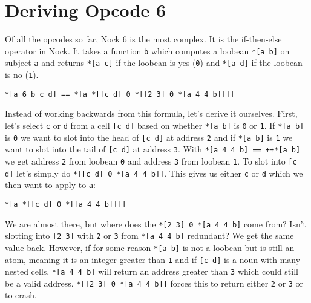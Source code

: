 \documentclass[twoside]{article}
\begin{document}
\section{Deriving Opcode 6}

Of all the opcodes so far, Nock 6 is the most complex. It is the if-then-else operator in Nock. It takes a function \lstinline[style=inlinecode]{b} which computes a loobean \lstinline[style=inlinecode]{*[a b]} on subject \lstinline[style=inlinecode]{a} and returns \lstinline[style=inlinecode]{*[a c]} if the loobean is yes (\lstinline[style=inlinecode]{0}) and \lstinline[style=inlinecode]{*[a d]} if the loobean is no (\lstinline[style=inlinecode]{1}).

\begin{lstlisting}[style=listingblock]
*[a 6 b c d] == *[a *[[c d] 0 *[[2 3] 0 *[a 4 4 b]]]]
\end{lstlisting}

\noindent
Instead of working backwards from this formula, let's derive it ourselves. First, let's select \lstinline[style=inlinecode]{c} or \lstinline[style=inlinecode]{d} from a cell \lstinline[style=inlinecode]{[c d]} based on whether \lstinline[style=inlinecode]{*[a b]} is \lstinline[style=inlinecode]{0} or \lstinline[style=inlinecode]{1}. If \lstinline[style=inlinecode]{*[a b]} is \lstinline[style=inlinecode]{0} we want to slot into the head of \lstinline[style=inlinecode]{[c d]} at address \lstinline[style=inlinecode]{2} and if \lstinline[style=inlinecode]{*[a b]} is \lstinline[style=inlinecode]{1} we want to slot into the tail of \lstinline[style=inlinecode]{[c d]} at address \lstinline[style=inlinecode]{3}. With \lstinline[style=inlinecode]{*[a 4 4 b] == ++*[a b]} we get address \lstinline[style=inlinecode]{2} from loobean \lstinline[style=inlinecode]{0} and address \lstinline[style=inlinecode]{3} from loobean \lstinline[style=inlinecode]{1}. To slot into \lstinline[style=inlinecode]{[c d]} let's simply do \lstinline[style=inlinecode]{*[[c d] 0 *[a 4 4 b]]}. This gives us either \lstinline[style=inlinecode]{c} or \lstinline[style=inlinecode]{d} which we then want to apply to \lstinline[style=inlinecode]{a}:

\begin{lstlisting}[style=listingblock]
*[a *[[c d] 0 *[[a 4 4 b]]]]
\end{lstlisting}

\noindent
We are almost there, but where does the \lstinline[style=inlinecode]{*[2 3] 0 *[a 4 4 b]} come from? Isn't slotting into \lstinline[style=inlinecode]{[2 3]} with \lstinline[style=inlinecode]{2} or \lstinline[style=inlinecode]{3} from \lstinline[style=inlinecode]{*[a 4 4 b]} redundant? We get the same value back. However, if for some reason \lstinline[style=inlinecode]{*[a b]} is not a loobean but is still an atom, meaning it is an integer greater than \lstinline[style=inlinecode]{1} and if \lstinline[style=inlinecode]{[c d]} is a noun with many nested cells, \lstinline[style=inlinecode]{*[a 4 4 b]} will return an address greater than \lstinline[style=inlinecode]{3} which could still be a valid address. \lstinline[style=inlinecode]{*[[2 3] 0 *[a 4 4 b]]} forces this to return either \lstinline[style=inlinecode]{2} or \lstinline[style=inlinecode]{3} or to crash.
\end{document}

